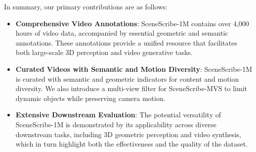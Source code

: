 In summary, our primary contributions are as follows:
\begin{itemize}
    \item \textbf{Comprehensive Video Annotations}: SceneScribe-1M contains over 4,000 hours of video data, accompanied by essential geometric and semantic annotations. These annotations provide a unified resource that facilitates both large-scale 3D perception and video generative tasks.
    \item \textbf{Curated Videos with Semantic and Motion Diversity}: 
     SceneScribe-1M is curated with semantic and geometric indicators for content and motion diversity. 
    We also introduce a multi-view filter for SceneScribe-MVS to limit dynamic objects while preserving camera motion.
    \item \textbf{Extensive Downstream Evaluation}: The potential versatility of SceneScribe-1M is demonstrated by its applicability across diverse downstream tasks, including 3D geometric perception and video synthesis, which in turn highlight both the effectiveness and the quality of the dataset.
\end{itemize}








